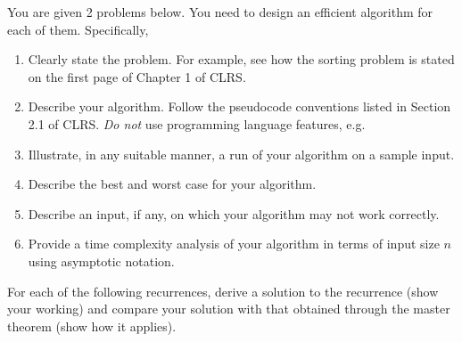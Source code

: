 \documentclass[a4paper]{exam}
\begin{document}
\begin{questions}
\question You are given 2 problems below. You need to design an efficient algorithm for each of them. Specifically,
    \begin{enumerate}
    \renewcommand{\theenumi}{\roman{enumi}} %
    \item Clearly state the problem. For example, see how the sorting problem is stated on the first page of Chapter 1 of CLRS.
    \item Describe your algorithm. Follow the pseudocode conventions listed in Section 2.1 of CLRS. \textit{Do not} use programming language features, e.g. 
    \item Illustrate, in any suitable manner, a run of your algorithm on a sample input.
    \item Describe the best and worst case for your algorithm.
    \item Describe an input, if any, on which your algorithm may not work correctly.
    \item Provide a time complexity analysis of your algorithm in terms of input size $n$ using asymptotic notation.
    \end{enumerate}

  
\question For each of the following recurrences, derive a solution to the recurrence (show your working) and compare your solution with that obtained through the master theorem (show how it applies). 
  \begin{parts}

\end{parts}
\end{questions}
\end{document}
